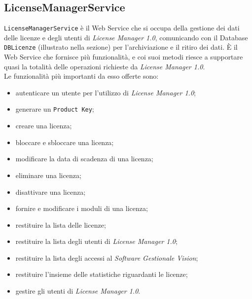 \subsection{LicenseManagerService}
\texttt{LicenseManagerService} è il Web Service che si occupa della gestione dei dati delle licenze e degli utenti di \textit{License Manager 1.0}, comunicando con il Database \texttt{DBLicenze} (illustrato nella sezione) per l'archiviazione e il ritiro dei dati. È il Web Service che fornisce più funzionalità, e coi suoi metodi riesce a supportare quasi la totalità delle operazioni richieste da \textit{License Manager 1.0}.\\
Le funzionalità più importanti da esso offerte sono:

\begin{itemize}
\item autenticare un utente per l'utilizzo di \textit{License Manager 1.0};
\item generare un \texttt{Product Key};
\item creare una licenza;
\item bloccare e sbloccare una licenza;
\item modificare la data di scadenza di una licenza;
\item eliminare una licenza;
\item disattivare una licenza;
\item fornire e modificare i moduli di una licenza;
\item restituire la lista delle licenze;
\item restituire la lista degli utenti di \textit{License Manager 1.0};
\item restituire la lista degli accessi al \textit{Software Gestionale Vision};
\item restituire l'insieme delle statistiche riguardanti le licenze;
\item gestire gli utenti di \textit{License Manager 1.0}.

\end{itemize}
 


